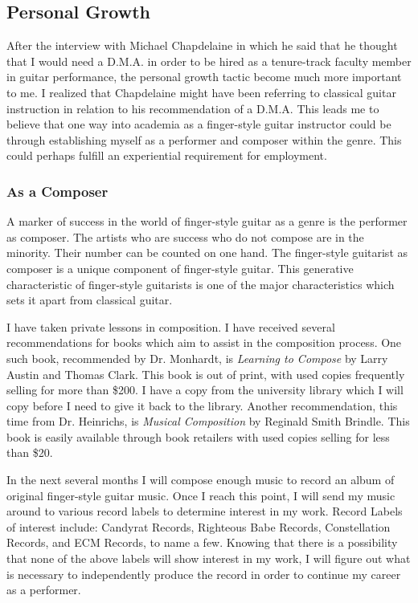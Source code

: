 \documentclass[12pt]{article}
\begin{document}
\subsection{Personal Growth}
\label{sec:personal-growth}
After the interview with Michael Chapdelaine in which he said that he
thought that I would need a D.M.A. in order to be hired as a
tenure-track faculty member in guitar performance, the personal growth
tactic become much more important to me. I realized that Chapdelaine
might have been referring to classical guitar instruction in relation
to his recommendation of a D.M.A. This leads me to believe that one
way into academia as a finger-style guitar instructor could be through
establishing myself as a performer and composer within the genre. This
could perhaps fulfill an experiential requirement for employment.
\subsubsection{As a Composer}
\label{sec:composer}
A marker of success in the world of finger-style guitar as a genre is
the performer as composer. The artists who are success who do not
compose are in the minority. Their number can be counted on one
hand. The finger-style guitarist as composer is a unique component of
finger-style guitar. This generative characteristic of finger-style
guitarists is one of the major characteristics which sets it apart
from classical guitar.

I have taken private lessons in composition. I have received several
recommendations for books which aim to assist in the composition
process. One such book, recommended by Dr. Monhardt, is \emph{Learning
  to Compose} by Larry Austin and Thomas Clark.\autocite{austin1989}
This book is out of print, with used copies frequently selling for
more than \$200. I have a copy from the university library which I
will copy before I need to give it back to the library. Another
recommendation, this time from Dr. Heinrichs, is \emph{Musical
  Composition} by Reginald Smith Brindle.\autocite{brindle} This book
is easily available through book retailers with used copies selling
for less than \$20.

In the next several months I will compose enough music to record an
album of original finger-style guitar music. Once I reach this point,
I will send my music around to various record labels to determine
interest in my work. Record Labels of interest include: Candyrat
Records, Righteous Babe Records, Constellation Records, and ECM
Records, to name a few.\autocites{candyrat,righteous} Knowing that
there is a possibility that none of the above labels will show
interest in my work, I will figure out what is necessary to
independently produce the record in order to continue my career as a
performer.
\end{document}
